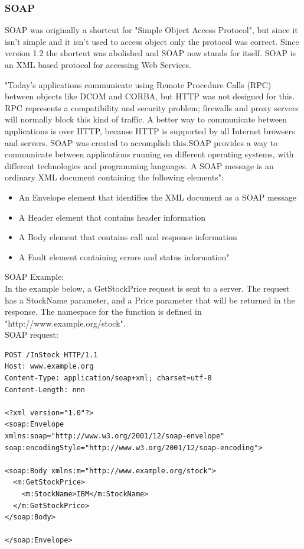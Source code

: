 \documentclass[12pt]{article}
\begin{document}
\subsubsection{SOAP}
SOAP was originally a shortcut for "Simple Object Access Protocol", but since it isn't simple 
and it isn't used to access object only the protocol was correct. Since version 1.2 the shortcut
was abolished and SOAP now stands for itself. SOAP is an XML based protocol for accessing Web Services.

"Today's applications communicate using Remote Procedure Calls (RPC) between objects like DCOM and CORBA, but HTTP was not designed for this. RPC represents a compatibility and security problem; firewalls and proxy servers will normally block this kind of traffic. A better way to communicate between applications is over HTTP, because HTTP is supported by all Internet browsers and servers. SOAP was created to accomplish this.SOAP provides a way to communicate between applications running on different operating systems, with different technologies and programming languages. A SOAP message is an ordinary XML document containing the following elements":
\begin{itemize}
\item An Envelope element that identifies the XML document as a SOAP message
\item A Header element that contains header information
\item A Body element that contains call and response information
\item A Fault element containing errors and status information"
\end{itemize}
SOAP Example: \\ In the example below, a GetStockPrice request is sent to a server. The request has a StockName parameter, and a Price parameter that will be returned in the response. The namespace for the function is defined in "http://www.example.org/stock".\\
SOAP request:
\begin{lstlisting}
POST /InStock HTTP/1.1
Host: www.example.org
Content-Type: application/soap+xml; charset=utf-8
Content-Length: nnn

<?xml version="1.0"?>
<soap:Envelope
xmlns:soap="http://www.w3.org/2001/12/soap-envelope"
soap:encodingStyle="http://www.w3.org/2001/12/soap-encoding">

<soap:Body xmlns:m="http://www.example.org/stock">
  <m:GetStockPrice>
    <m:StockName>IBM</m:StockName>
  </m:GetStockPrice>
</soap:Body>

</soap:Envelope>
\end{lstlisting}
\end{document}
